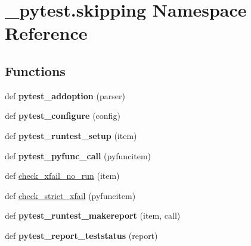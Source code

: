 \hypertarget{namespace__pytest_1_1skipping}{}\section{\+\_\+pytest.\+skipping Namespace Reference}
\label{namespace__pytest_1_1skipping}
\subsection*{Functions}
\begin{DoxyCompactItemize}
\item 
\mbox{\label{namespace__pytest_1_1skipping_aed6ad195c84b911f612240b00089e6c9}} 
def {\bfseries pytest\+\_\+addoption} (parser)
\item 
\mbox{\label{namespace__pytest_1_1skipping_a902b038792934e1bb30237c88d7ad1ff}} 
def {\bfseries pytest\+\_\+configure} (config)
\item 
\mbox{\label{namespace__pytest_1_1skipping_adbf7399a73e7bd47eb18a010431b0c32}} 
def {\bfseries pytest\+\_\+runtest\+\_\+setup} (item)
\item 
\mbox{\label{namespace__pytest_1_1skipping_a5575d2b97a8e6cf193049246cd9ebc8e}} 
def {\bfseries pytest\+\_\+pyfunc\+\_\+call} (pyfuncitem)
\item 
def \hyperlink{namespace__pytest_1_1skipping_a0ed078302da65740d6b48c257cd227ac}{check\+\_\+xfail\+\_\+no\+\_\+run} (item)
\item 
def \hyperlink{namespace__pytest_1_1skipping_a016a288839cc6465c31721d4585080f9}{check\+\_\+strict\+\_\+xfail} (pyfuncitem)
\item 
\mbox{\label{namespace__pytest_1_1skipping_aad559c39163ea81ac8bf9d6019270eb9}} 
def {\bfseries pytest\+\_\+runtest\+\_\+makereport} (item, call)
\item 
\mbox{\label{namespace__pytest_1_1skipping_af09c7288e5ef7349e72c4cf3759ae398}} 
def {\bfseries pytest\+\_\+report\+\_\+teststatus} (report)
\item 
\mbox{\label{namespace__pytest_1_1skipping_af09653493d15283052e4b2b98c53b13c}} 

\end{DoxyCompactItemize}
